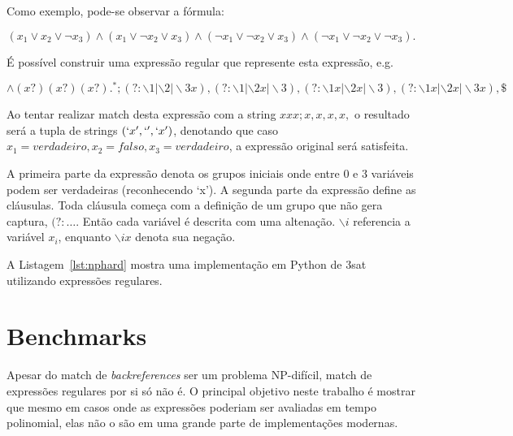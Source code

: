 \documentclass[a4paper,12pt,oneside,onecolumn]{uerj}
\begin{document}
Como exemplo, pode-se observar a fórmula:

\setlength\abovedisplayskip{0pt}
\begin{equation*}
(x_1 \lor x_2 \lor \neg x_3) \wedge 
(x_1 \lor \neg x_2 \lor x_3) \wedge
(\neg x_1 \lor \neg x_2 \lor x_3) \wedge 
(\neg x_1 \lor \neg x_2 \lor \neg x_3).
\end{equation*}

É possível construir uma expressão regular que represente esta expressão, e.g.

\setlength\abovedisplayskip{0pt}
\begin{equation*}
\wedge (x?)(x?)(x?).^*;
                   (?:\backslash 1|\backslash 2|\backslash 3x),
                   (?:\backslash 1|\backslash 2x|\backslash 3),
                   (?:\backslash 1x|\backslash 2x|\backslash 3),
                   (?:\backslash 1x|\backslash 2x|\backslash 3x), \$
\end{equation*}

Ao tentar realizar match desta expressão com a string $xxx;x,x,x,x,$ o resultado será a tupla de strings $(`x', `', `x')$, denotando que caso $x_1 = verdadeiro, x_2 = falso, x_3 = verdadeiro$, a expressão original será satisfeita.

A primeira parte da expressão denota os grupos iniciais onde entre 0 e 3 variáveis podem ser verdadeiras (reconhecendo `x'). A segunda parte da expressão define as cláusulas. Toda cláusula começa com a definição de um grupo que não gera captura, $(?:\ldots$. Então cada variável é descrita com uma altenação. $\backslash i$ referencia a variável $x_i$, enquanto $\backslash ix$ denota sua negação.

A Listagem~\ref{lst:nphard} mostra uma implementação em Python de {\sc 3sat} utilizando expressões regulares.

\vspace{0.5cm}


\section{Benchmarks}

Apesar do match de \emph{backreferences} ser um problema NP-difícil, match de expressões regulares por si só não é. O principal objetivo neste trabalho é mostrar que mesmo em casos onde as expressões poderiam ser avaliadas em tempo polinomial, elas não o são em uma grande parte de implementações modernas.
\end{document}
